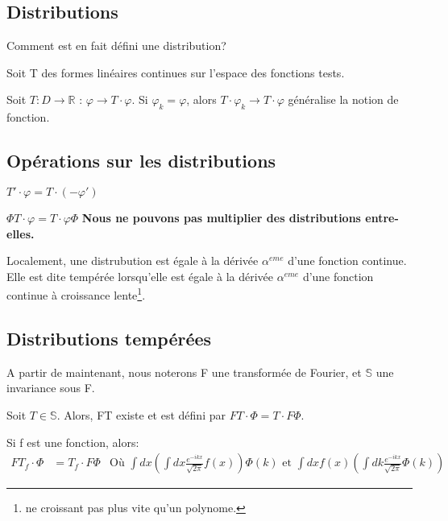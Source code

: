 \documentclass[../notesdecours.tex]{subfiles}
\begin{document}
\subsection{Distributions}

Comment est en fait défini une distribution? 

Soit T des formes linéaires continues sur l'espace des fonctions tests.
\begin{Property}
Soit $T: D \rightarrow \mathbb{R}$ : $\varphi \rightarrow T\cdot\varphi$. Si $\varphi_k = \varphi$, alors $T\cdot\varphi_k \rightarrow T\cdot\varphi$ généralise la notion de fonction.
\end{Property}

\subsection{Opérations sur les distributions}
\begin{Property}
$T'\cdot\varphi = T\cdot(-\varphi')$
\end{Property}
\begin{Property}
$\Phi T\cdot\varphi = T\cdot\varphi\Phi$
\textbf{Nous ne pouvons pas multiplier des distributions entre-elles.}
\end{Property}
\begin{theorem}
Localement, une distrubution est égale à la dérivée $\alpha^{eme}$ d'une fonction continue. Elle est dite tempérée lorsqu'elle est égale à la dérivée $\alpha^{eme}$ d'une fonction continue à croissance lente\footnote{ne croissant pas plus vite qu'un polynome.}.
\end{theorem}
\subsection{Distributions tempérées}
A partir de maintenant, nous noterons F une transformée de Fourier, et $\mathbb{S}$ une invariance sous F.
\begin{definition} Soit $T \in \mathbb{S}$. Alors, FT existe et est défini par $FT\cdot\Phi = T\cdot F\Phi$.
\end{definition}

Si f est une fonction, alors:
\begin{align}
FT_f\cdot\Phi &= T_f\cdot F\Phi		&\text{Où }\int dx (\int dx \frac{e^{-ikx}}{\sqrt{2\pi}}f(x))\Phi(k) \text{ et } \int dx f(x) (\int dk \frac{e^{-ikx}}{\sqrt{2\pi}}\Phi(k))
\end{align}
\end{document}
